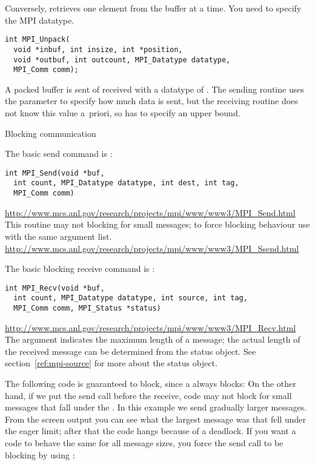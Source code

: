 Conversely,  retrieves one element
from the buffer at a time. You need to specify the MPI datatype.
\begin{verbatim}
int MPI_Unpack(
  void *inbuf, int insize, int *position,
  void *outbuf, int outcount, MPI_Datatype datatype,
  MPI_Comm comm);
\end{verbatim}

A packed buffer is sent of received with a datatype of
. The sending routine uses the 
parameter to specify how much data is sent, but the receiving routine
does not know this value a~priori, so has to specify an upper bound.


 {Blocking communication}

The basic send command is :
\begin{verbatim}
int MPI_Send(void *buf, 
  int count, MPI_Datatype datatype, int dest, int tag,
  MPI_Comm comm)
\end{verbatim}
\url{http://www.mcs.anl.gov/research/projects/mpi/www/www3/MPI_Send.html}
This routine may not blocking for small messages; to force blocking
behaviour use  with the same argument list.
\url{http://www.mcs.anl.gov/research/projects/mpi/www/www3/MPI_Ssend.html}

The basic blocking receive command is :
\begin{verbatim}
int MPI_Recv(void *buf, 
  int count, MPI_Datatype datatype, int source, int tag,
  MPI_Comm comm, MPI_Status *status)
\end{verbatim}
\url{http://www.mcs.anl.gov/research/projects/mpi/www/www3/MPI_Recv.html}
The  argument indicates the maximum length of a message; the
actual length of the received message can be determined 
from the status object. See section~\ref{ref:mpi-source}
for more about the status object.

The following code is guaranteed to block, since a 
always blocks:
On the other hand, if we put the send call before the receive,
code may not block for small messages
that fall under the . In this example we send
gradually larger messages. From the screen output you can see what
the largest message was that fell under the eager limit; after that the code
hangs because of a deadlock.
%
%
%
If you want a code to behave the same for all message sizes,
you force the send call to be blocking by using :

